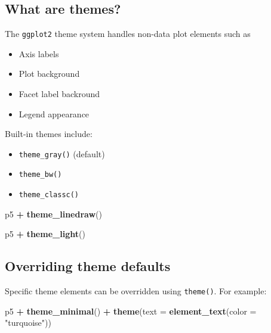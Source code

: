 \documentclass[]{book}
\newenvironment{Shaded}{\begin{snugshade}}{\end{snugshade}}
\newcommand{\KeywordTok}[1]{\textcolor[rgb]{0.13,0.29,0.53}{\textbf{#1}}}
\newcommand{\DataTypeTok}[1]{\textcolor[rgb]{0.13,0.29,0.53}{#1}}
\newcommand{\StringTok}[1]{\textcolor[rgb]{0.31,0.60,0.02}{#1}}
\newcommand{\OperatorTok}[1]{\textcolor[rgb]{0.81,0.36,0.00}{\textbf{#1}}}
\newcommand{\NormalTok}[1]{#1}
\providecommand{\tightlist}{%
  \setlength{\itemsep}{0pt}\setlength{\parskip}{0pt}}
\begin{document}
\subsection{What are themes?}\label{what-are-themes}

The \texttt{ggplot2} theme system handles non-data plot elements such as

\begin{itemize}
\tightlist
\item
  Axis labels
\item
  Plot background
\item
  Facet label backround
\item
  Legend appearance
\end{itemize}

Built-in themes include:

\begin{itemize}
\tightlist
\item
  \texttt{theme\_gray()} (default)
\item
  \texttt{theme\_bw()}
\item
  \texttt{theme\_classc()}
\end{itemize}

\begin{Shaded}
\begin{Highlighting}[]
\NormalTok{p5 }\OperatorTok{+}\StringTok{ }\KeywordTok{theme_linedraw}\NormalTok{()}
\end{Highlighting}
\end{Shaded}

\begin{Shaded}
\begin{Highlighting}[]
\NormalTok{p5 }\OperatorTok{+}\StringTok{ }\KeywordTok{theme_light}\NormalTok{()}
\end{Highlighting}
\end{Shaded}

\subsection{Overriding theme defaults}\label{overriding-theme-defaults}

Specific theme elements can be overridden using \texttt{theme()}. For
example:

\begin{Shaded}
\begin{Highlighting}[]
\NormalTok{p5 }\OperatorTok{+}\StringTok{ }\KeywordTok{theme_minimal}\NormalTok{() }\OperatorTok{+}
\StringTok{  }\KeywordTok{theme}\NormalTok{(}\DataTypeTok{text =} \KeywordTok{element_text}\NormalTok{(}\DataTypeTok{color =} \StringTok{"turquoise"}\NormalTok{))}
\end{Highlighting}
\end{Shaded}
\end{document}
